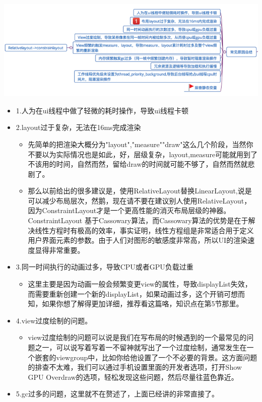 \documentclass[9pt, b5paper]{article}
\begin{document}
\includegraphics[width=.9\linewidth]{./pic/reasons.png}
\begin{itemize}
\item 1.人为在ui线程中做了轻微的耗时操作，导致ui线程卡顿
\item 2.layout过于复杂，无法在16ms完成渲染   
\begin{itemize}
\item 先简单的把渲染大概分为"layout","measure""draw"这么几个阶段，当然你不要以为实际情况也是如此，好，层级复杂，layout,measure可能就用到了不该用的时间，自然而然，留给draw的时间就可能不够了，自然而然就悲剧了。
\item 那么以前给出的很多建议是，使用RelativeLayout替换LinearLayout,说是可以减少布局层次，然鹅，现在请不要在建议别人使用RelativeLayout，因为ConstraintLayout才是一个更高性能的消灭布局层级的神器。ConstraintLayout 基于Cassowary算法，而Cassowary算法的优势是在于解决线性方程时有极高的效率，事实证明，线性方程组是非常适合用于定义用户界面元素的参数。由于人们对图形的敏感度非常高，所以UI的渲染速度显得非常重要。
\end{itemize}
\item 3.同一时间执行的动画过多，导致CPU或者GPU负载过重
\begin{itemize}
\item 这里主要是因为动画一般会频繁变更view的属性，导致displayList失效，而需要重新创建一个新的displayList，如果动画过多，这个开销可想而知，如果你想了解得更加详细，推荐看这篇咯，知识点在第5节那里。
\end{itemize}
\item 4.view过度绘制的问题。
\begin{itemize}
\item view过度绘制的问题可以说是我们在写布局的时候遇到的一个最常见的问题之一，可以说写着写着一不留神就写出了一个过度绘制，通常发生在一个嵌套的viewgroup中，比如你给他设置了一个不必要的背景。这方面问题的排查不太难，我们可以通过手机设置里面的开发者选项，打开Show GPU Overdraw的选项，轻松发现这些问题，然后尽量往蓝色靠近。
\end{itemize}
\item 5.gc过多的问题，这里就不在赘述了，上面已经讲的非常直接了。

\end{itemize}
\end{document}
